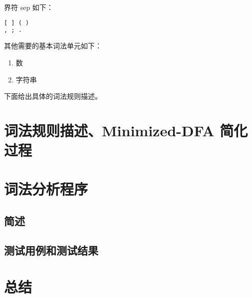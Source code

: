\documentclass[lang=cn]{elegantpaper}
\begin{document}
界符 sep 如下：
\begin{lstlisting}[language=pascal]
[ ] ( )
, ; .
\end{lstlisting}

其他需要的基本词法单元如下：
\begin{enumerate}
    \item 数
    \item 字符串
\end{enumerate}

下面给出具体的词法规则描述。

\section{词法规则描述、Minimized-DFA 简化过程}

\section{词法分析程序}

\subsection{简述}

\subsection{测试用例和测试结果}

\section{总结}



    

\end{document}
